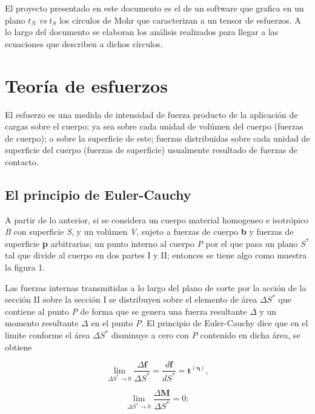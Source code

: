 \documentclass{article}
\begin{document}
    El proyecto presentado en este documento es el de un software que grafica en un plano
    ${t}_{N}$ \textit{vs} ${t}_{S}$ los círculos de Mohr que caracterizan a un tensor 
    de esfuerzos. A lo largo del documento se elaboran los análisis realizados para llegar 
    a las ecuaciones que describen a dichos círculos.

    \section{Teor\'{i}a de esfuerzos}

    El esfuerzo es una medida de intensidad de fuerza producto de la aplicación de cargas
    sobre el cuerpo; ya sea sobre cada unidad de volúmen del cuerpo (fuerzas de cuerpo);
    o sobre la superficie de este; fuerzas distribuidas sobre cada unidad de superficie
    del cuerpo (fuerzas de superficie) usualmente resultado de fuerzas de contacto.

    \subsection{El principio de Euler-Cauchy}

    A partir de lo anterior, si se considera un cuerpo material homogeneo e isotrópico
    \textit{B} con superficie \textit{S}, y un volúmen \textit{V}, sujeto a fuerzas de
    cuerpo \textbf{b} y fuerzas de superficie \textbf{p} arbitrarias; un punto interno 
    al cuerpo \textit{P} por el que pasa un plano $S^{*}$ tal que divide al cuerpo
    en dos partes I y II; entonces se tiene algo como muestra la figura 1.

    Las fuerzas internas transmitidas a lo largo del plano de corte por la acción de
    la sección II sobre la sección I se distribuyen sobre el elemento de área
    $\Delta S^{*}$ que contiene al punto \textit{P} de forma que se genera una fuerza 
    resultante $\Delta$ y un momento resultante $\Delta$ en el punto 
    \textit{P}. El principio de Euler-Cauchy dice que en el limite conforme el área
    $\Delta S^{*}$ disminuye a cero con \textit{P} contenido en dicha área, se obtiene

    \begin{equation}
        \lim_{\Delta S^{*} \to 0} \frac{\Delta \bm{f}}{\Delta S^{*}} =
        \frac{d \bm{f}}{dS^{*}} =
        \bm{t^{\bm{(\eta)}}},
    \end{equation}

    \begin{equation}
        \lim_{\Delta S^{*} \to 0} \frac{\Delta \bm{M}}{\Delta S^{*}} = 0;
    \end{equation}
\end{document}
